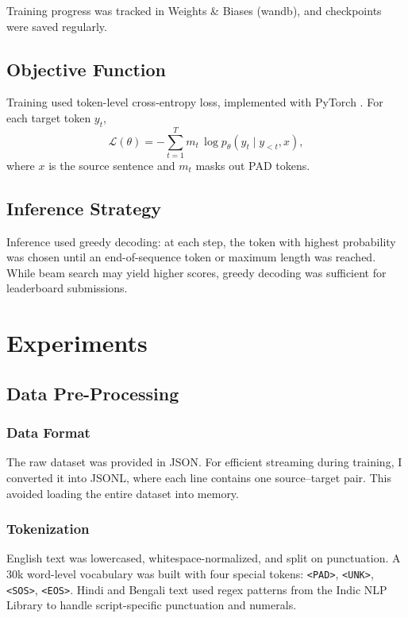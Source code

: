 \documentclass[11pt, oneside]{article}   	%
\begin{document}
Training progress was tracked in Weights \& Biases (wandb), and checkpoints were saved regularly.

\subsection{Objective Function}
Training used token-level cross-entropy loss, implemented with PyTorch \cite{paszke2019pytorch,pytorchdocs}. For each target token $y_t$,
\[
\mathcal{L}(\theta) = - \sum_{t=1}^{T} m_t \, \log p_\theta(y_t \mid y_{<t}, x),
\]
where $x$ is the source sentence and $m_t$ masks out PAD tokens.


\subsection{Inference Strategy}
Inference used greedy decoding: at each step, the token with highest probability was chosen until an end-of-sequence token or maximum length was reached. While beam search may yield higher scores, greedy decoding was sufficient for leaderboard submissions.


\section{Experiments}

\subsection{Data Pre-Processing}

\subsubsection{Data Format}  
The raw dataset was provided in JSON. For efficient streaming during training, I converted it into JSONL, where each line contains one source–target pair. This avoided loading the entire dataset into memory.

\subsubsection{Tokenization}  
English text was lowercased, whitespace-normalized, and split on punctuation. A 30k word-level vocabulary was built with four special tokens: \texttt{<PAD>}, \texttt{<UNK>}, \texttt{<SOS>}, \texttt{<EOS>}. Hindi and Bengali text used regex patterns from the Indic NLP Library \cite{indicnlp} to handle script-specific punctuation and numerals.
\end{document}
